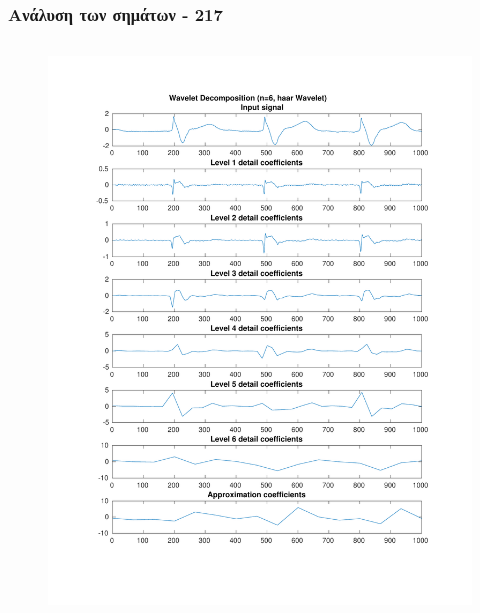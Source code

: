 \documentclass{beamer}
\begin{document}
\begin{frame}
\frametitle{Ανάλυση των σημάτων - 217}

\begin{columns}
\begin{figure}
\includegraphics[width=\textwidth]{fig/217l1_dwt1.pdf}
\end{figure}


\end{columns}
\end{frame}
\end{document}
